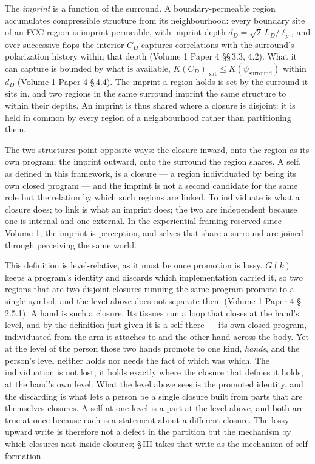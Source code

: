 \documentclass[11pt,oneside]{report}
\theoremstyle{definition}
\theoremstyle{remark}
\begin{document}
The \emph{imprint} is a function of the surround. A boundary-permeable region
accumulates compressible structure from its neighbourhood: every boundary site
of an FCC region is imprint-permeable, with imprint depth
\ensuremath{d_D = \sqrt{2}\,L_D/\ell_p}, and over successive flops the interior
\ensuremath{C_D} captures correlations with the surround's polarization history
within that depth (Volume 1 Paper 4 \S\S\,3.3, 4.2). What it can capture is
bounded by what is available,
\ensuremath{K(C_D)\big|_{\mathrm{sat}} \le K(\psi_{\mathrm{surround}})} within
\ensuremath{d_D} (Volume 1 Paper 4 \S\,4.4). The imprint a region holds is set
by the surround it sits in, and two regions in the same surround imprint the
same structure to within their depths. An imprint is thus shared where a
closure is disjoint: it is held in common by every region of a neighbourhood
rather than partitioning them.

The two structures point opposite ways: the closure inward, onto the region as
its own program; the imprint outward, onto the surround the region shares. A
self, as defined in this framework, is a closure --- a region individuated by
being its own closed program --- and the imprint is not a second candidate for
the same role but the relation by which such regions are linked. To individuate
is what a closure does; to link is what an imprint does; the two are
independent because one is internal and one external. In the experiential
framing reserved since Volume 1, the imprint is perception, and selves that
share a surround are joined through perceiving the same world.

This definition is level-relative, as it must be once promotion is lossy.
\ensuremath{G(k)} keeps a program's identity and discards which implementation
carried it, so two regions that are two disjoint closures running the same
program promote to a single symbol, and the level above does not separate them
(Volume 1 Paper 4 \S\,2.5.1). A hand is such a closure. Its tissues run a loop
that closes at the hand's level, and by the definition just given it is a self
there --- its own closed program, individuated from the arm it attaches to and
the other hand across the body. Yet at the level of the person those two hands
promote to one kind, \emph{hands}, and the person's level neither holds nor
needs the fact of which was which. The individuation is not lost; it holds
exactly where the closure that defines it holds, at the hand's own level. What
the level above sees is the promoted identity, and the discarding is what lets
a person be a single closure built from parts that are themselves closures. A
self at one level is a part at the level above, and both are true at once
because each is a statement about a different closure. The lossy upward write
is therefore not a defect in the partition but the mechanism by which closures
nest inside closures; \S\,III takes that write as the mechanism of
self-formation.
\end{document}
